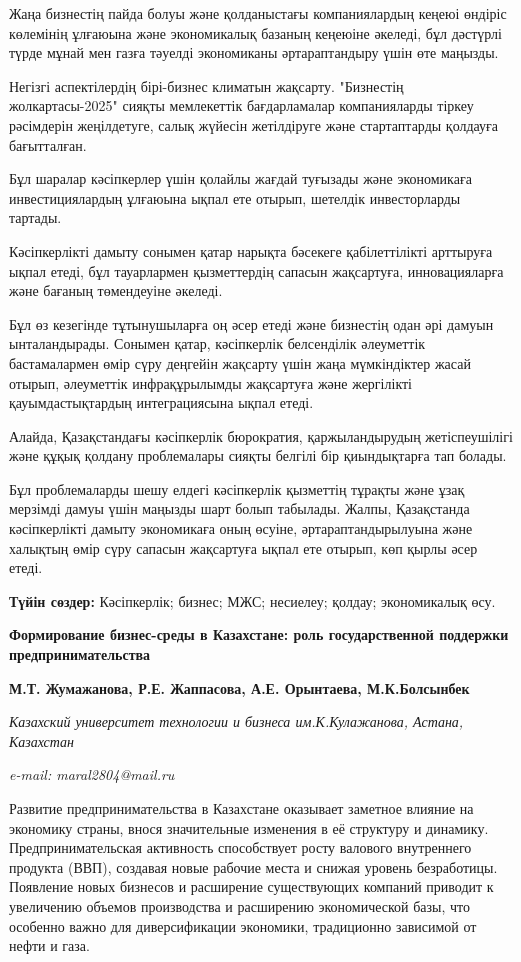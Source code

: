 Жаңа бизнестің пайда болуы және қолданыстағы компаниялардың кеңеюі
өндіріс көлемінің ұлғаюына және экономикалық базаның кеңеюіне әкеледі,
бұл дәстүрлі түрде мұнай мен газға тәуелді экономиканы әртараптандыру
үшін өте маңызды.

Негізгі аспектілердің бірі-бизнес климатын жақсарту. "Бизнестің
жолкартасы-2025" сияқты мемлекеттік бағдарламалар компанияларды тіркеу
рәсімдерін жеңілдетуге, салық жүйесін жетілдіруге және стартаптарды
қолдауға бағытталған.

Бұл шаралар кәсіпкерлер үшін қолайлы жағдай туғызады және экономикаға
инвестициялардың ұлғаюына ықпал ете отырып, шетелдік инвесторларды
тартады.

Кәсіпкерлікті дамыту сонымен қатар нарықта бәсекеге қабілеттілікті
арттыруға ықпал етеді, бұл тауарлармен қызметтердің сапасын жақсартуға,
инновацияларға және бағаның төмендеуіне әкеледі.

Бұл өз кезегінде тұтынушыларға оң әсер етеді және бизнестің одан әрі
дамуын ынталандырады. Сонымен қатар, кәсіпкерлік белсенділік әлеуметтік
бастамалармен өмір сүру деңгейін жақсарту үшін жаңа мүмкіндіктер жасай
отырып, әлеуметтік инфрақұрылымды жақсартуға және жергілікті
қауымдастықтардың интеграциясына ықпал етеді.

Алайда, Қазақстандағы кәсіпкерлік бюрократия, қаржыландырудың
жетіспеушілігі және құқық қолдану проблемалары сияқты белгілі бір
қиындықтарға тап болады.

Бұл проблемаларды шешу елдегі кәсіпкерлік қызметтің тұрақты және ұзақ
мерзімді дамуы үшін маңызды шарт болып табылады. Жалпы, Қазақстанда
кәсіпкерлікті дамыту экономикаға оның өсуіне, әртараптандырылуына және
халықтың өмір сүру сапасын жақсартуға ықпал ете отырып, көп қырлы әсер
етеді.

{\bfseries Түйін сөздер:} Кәсіпкерлік; бизнес; МЖС; несиелеу; қолдау;
экономикалық өсу.

{\bfseries Формирование бизнес-среды в Казахстане: роль государственной
поддержки предпринимательства}

{\bfseries М.Т. Жумажанова, Р.Е. Жаппасова, А.Е. Орынтаева, М.К.Болсынбек}

\emph{Казахский университет технологии и бизнеса им.К.Кулажанова,
Астана, Казахстан}

\emph{e-mail: maral2804@mail.ru}

Развитие предпринимательства в Казахстане оказывает заметное влияние на
экономику страны, внося значительные изменения в её структуру и
динамику. Предпринимательская активность способствует росту валового
внутреннего продукта (ВВП), создавая новые рабочие места и снижая
уровень безработицы. Появление новых бизнесов и расширение существующих
компаний приводит к увеличению объемов производства и расширению
экономической базы, что особенно важно для диверсификации экономики,
традиционно зависимой от нефти и газа.

